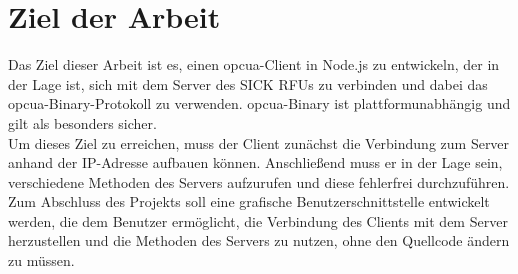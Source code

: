 \section{Ziel der Arbeit}
Das Ziel dieser Arbeit ist es, einen \ac{opcua}-Client in Node.js zu entwickeln, der in der Lage ist, sich mit dem Server des SICK RFUs zu verbinden und dabei das \ac{opcua}-Binary-Protokoll zu verwenden. \ac{opcua}-Binary ist plattformunabhängig und gilt als besonders sicher.\\

Um dieses Ziel zu erreichen, muss der Client zunächst die Verbindung zum Server anhand der IP-Adresse aufbauen können. Anschließend muss er in der Lage sein, verschiedene Methoden des Servers aufzurufen und diese fehlerfrei durchzuführen.\\

Zum Abschluss des Projekts soll eine grafische Benutzerschnittstelle entwickelt werden, die dem Benutzer ermöglicht, die Verbindung des Clients mit dem Server herzustellen und die Methoden des Servers zu nutzen, ohne den Quellcode ändern zu müssen.\\



